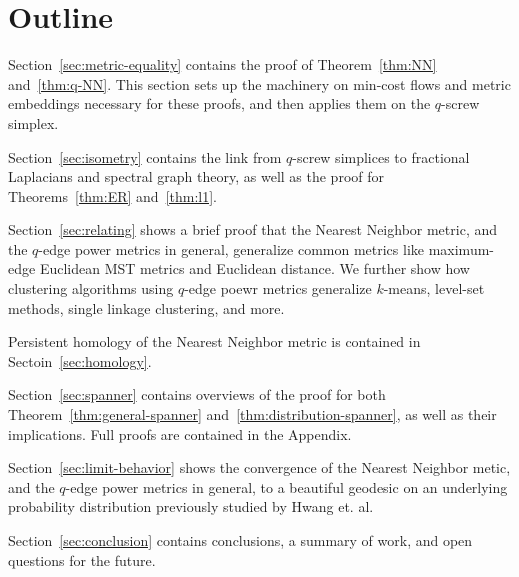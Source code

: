 \section{Outline}
%  
Section~\ref{sec:metric-equality} contains the proof of Theorem~\ref{thm:NN}
and~\ref{thm:q-NN}. This section sets up the machinery on min-cost flows
and metric embeddings necessary for these proofs, and then applies them on
the $q$-screw simplex.

Section~\ref{sec:isometry} contains the link from $q$-screw simplices to
fractional Laplacians and spectral graph theory, as well as the proof for
Theorems~\ref{thm:ER} and~\ref{thm:l1}.

Section~\ref{sec:relating} shows a brief proof that the Nearest Neighbor
metric, and the $q$-edge power metrics in general, generalize common
metrics like maximum-edge Euclidean MST metrics and Euclidean distance. We
further show how clustering algorithms using $q$-edge poewr metrics
generalize $k$-means, level-set methods, single linkage clustering, and
more.

Persistent homology of the Nearest Neighbor metric is contained in
Sectoin~\ref{sec:homology}.

Section~\ref{sec:spanner} contains overviews of the proof for both
Theorem~\ref{thm:general-spanner} and~\ref{thm:distribution-spanner}, as
well as their implications. Full
proofs are contained in the Appendix.

Section~\ref{sec:limit-behavior} shows the convergence of the Nearest Neighbor
metic, and the $q$-edge power metrics in general, to a beautiful geodesic
on an underlying probability distribution previously studied by Hwang et.
al.

Section~\ref{sec:conclusion} contains conclusions, a summary of work, and
open questions for the future.
